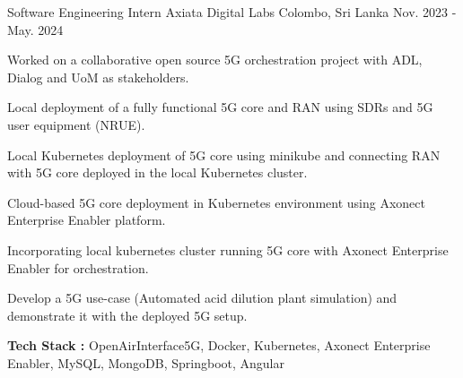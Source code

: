 

\begin{cventries}


\cventry
{Software Engineering Intern} %
{Axiata Digital Labs} %
{Colombo, Sri Lanka} %
{Nov. 2023 - May. 2024} %
{ %
\begin{cvitems}
\item {Worked on a collaborative open source 5G orchestration project with ADL, Dialog and UoM as stakeholders.}
\item {Local deployment of a fully functional 5G core and RAN using SDRs and 5G user equipment (NRUE).}
\item {Local Kubernetes deployment of 5G core using minikube and connecting RAN with 5G core deployed in the local Kubernetes cluster.}
\item {Cloud-based 5G core deployment in Kubernetes environment using Axonect Enterprise Enabler platform.}
\item {Incorporating local kubernetes cluster running 5G core with Axonect Enterprise Enabler for orchestration.}
\item {Develop a 5G use-case (Automated acid dilution plant simulation) and demonstrate it with the deployed 5G setup.}
\item \textbf{Tech Stack :} {OpenAirInterface5G, Docker, Kubernetes, Axonect Enterprise Enabler, MySQL, MongoDB, Springboot, Angular}
\end{cvitems}
}


\end{cventries}
